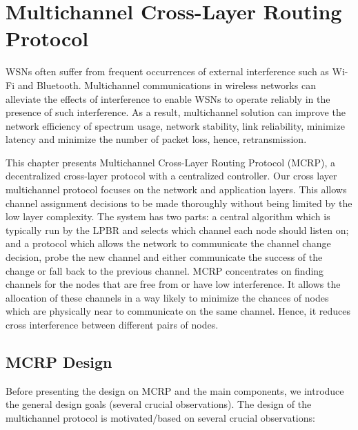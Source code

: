 \chapter{Multichannel Cross-Layer Routing Protocol}
\label{MCRP}

WSNs often suffer from frequent occurrences of external interference such as Wi-Fi and Bluetooth.
Multichannel communications in wireless networks can alleviate the effects of interference to enable WSNs to operate reliably in the presence of such interference. As a result, multichannel solution can improve the network efficiency of spectrum usage, network stability, link reliability, minimize latency and minimize the number of packet loss, hence, retransmission.

This chapter presents Multichannel Cross-Layer Routing Protocol (MCRP), a decentralized cross-layer protocol with a centralized controller. Our cross layer multichannel protocol focuses on the network and application layers. This allows channel assignment decisions to be made thoroughly without being limited by the low layer complexity. The system has two parts: a central algorithm which is typically run by the LPBR and selects which channel each node should listen on; and a protocol which allows the network to communicate the channel change decision, probe the new channel and either communicate the success of the change or fall back to the previous channel. MCRP concentrates on finding channels for the nodes that are free from or have low interference. It allows the allocation of these channels in a way likely to minimize the chances of nodes which are physically near to communicate on the same channel. Hence, it reduces cross interference between different pairs of nodes.

\section{MCRP Design}
Before presenting the design on MCRP and the main components, we introduce the general design goals (several crucial observations). The design of the multichannel protocol is motivated/based on several crucial observations: 


